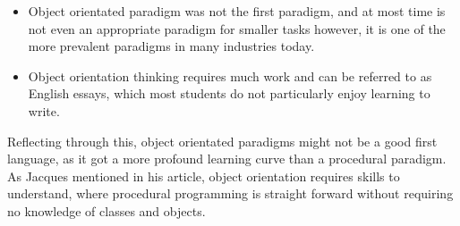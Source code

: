 \begin{itemize}
 \item Object orientated paradigm was not the first paradigm, and at most time is not even an appropriate paradigm for smaller tasks however, it is one of the more prevalent paradigms in many industries today.
 \item Object orientation thinking requires much work and can be referred to as English essays, which most students do not particularly enjoy learning to write.\cite{tutlisp}\cite{medlisp}
\end{itemize}
Reflecting through this, object orientated paradigms might not be a good first language, as it got a more profound learning curve than a procedural paradigm. As Jacques mentioned in his article, object orientation requires skills to understand, where procedural programming is straight forward without requiring no knowledge of classes and objects.\\
\\